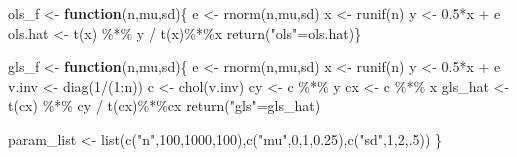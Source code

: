 \documentclass[11pt,a4paper]{article}
\newenvironment{Shaded}{\begin{snugshade}}{\end{snugshade}}
\newcommand{\ControlFlowTok}[1]{\textcolor[rgb]{0.13,0.29,0.53}{\textbf{#1}}}
\newcommand{\DecValTok}[1]{\textcolor[rgb]{0.00,0.00,0.81}{#1}}
\newcommand{\FloatTok}[1]{\textcolor[rgb]{0.00,0.00,0.81}{#1}}
\newcommand{\FunctionTok}[1]{\textcolor[rgb]{0.00,0.00,0.00}{#1}}
\newcommand{\NormalTok}[1]{#1}
\newcommand{\OtherTok}[1]{\textcolor[rgb]{0.56,0.35,0.01}{#1}}
\newcommand{\SpecialCharTok}[1]{\textcolor[rgb]{0.00,0.00,0.00}{#1}}
\newcommand{\StringTok}[1]{\textcolor[rgb]{0.31,0.60,0.02}{#1}}
\begin{document}
\begin{Shaded}
\begin{Highlighting}[]
\NormalTok{ols\_f }\OtherTok{\textless{}{-}} \ControlFlowTok{function}\NormalTok{(n,mu,sd)\{}
\NormalTok{  e }\OtherTok{\textless{}{-}} \FunctionTok{rnorm}\NormalTok{(n,mu,sd)}
\NormalTok{  x }\OtherTok{\textless{}{-}} \FunctionTok{runif}\NormalTok{(n)}
\NormalTok{  y }\OtherTok{\textless{}{-}} \FloatTok{0.5}\SpecialCharTok{*}\NormalTok{x }\SpecialCharTok{+}\NormalTok{ e}
\NormalTok{  ols.hat }\OtherTok{\textless{}{-}} \FunctionTok{t}\NormalTok{(x) }\SpecialCharTok{\%*\%}\NormalTok{ y }\SpecialCharTok{/} \FunctionTok{t}\NormalTok{(x)}\SpecialCharTok{\%*\%}\NormalTok{x}
  \FunctionTok{return}\NormalTok{(}\StringTok{"ols"}\OtherTok{=}\NormalTok{ols.hat)\}}

\NormalTok{gls\_f }\OtherTok{\textless{}{-}} \ControlFlowTok{function}\NormalTok{(n,mu,sd)\{}
\NormalTok{  e }\OtherTok{\textless{}{-}} \FunctionTok{rnorm}\NormalTok{(n,mu,sd)}
\NormalTok{  x }\OtherTok{\textless{}{-}} \FunctionTok{runif}\NormalTok{(n)}
\NormalTok{  y }\OtherTok{\textless{}{-}} \FloatTok{0.5}\SpecialCharTok{*}\NormalTok{x }\SpecialCharTok{+}\NormalTok{ e}
\NormalTok{  v.inv }\OtherTok{\textless{}{-}} \FunctionTok{diag}\NormalTok{(}\DecValTok{1}\SpecialCharTok{/}\NormalTok{(}\DecValTok{1}\SpecialCharTok{:}\NormalTok{n))}
\NormalTok{  c }\OtherTok{\textless{}{-}} \FunctionTok{chol}\NormalTok{(v.inv)}
\NormalTok{  cy }\OtherTok{\textless{}{-}}\NormalTok{ c }\SpecialCharTok{\%*\%}\NormalTok{ y}
\NormalTok{  cx }\OtherTok{\textless{}{-}}\NormalTok{ c }\SpecialCharTok{\%*\%}\NormalTok{ x}
\NormalTok{  gls\_hat }\OtherTok{\textless{}{-}} \FunctionTok{t}\NormalTok{(cx) }\SpecialCharTok{\%*\%}\NormalTok{ cy }\SpecialCharTok{/} \FunctionTok{t}\NormalTok{(cx)}\SpecialCharTok{\%*\%}\NormalTok{cx}
  \FunctionTok{return}\NormalTok{(}\StringTok{"gls"}\OtherTok{=}\NormalTok{gls\_hat)}
  
\NormalTok{  param\_list }\OtherTok{\textless{}{-}} \FunctionTok{list}\NormalTok{(}\FunctionTok{c}\NormalTok{(}\StringTok{"n"}\NormalTok{,}\DecValTok{100}\NormalTok{,}\DecValTok{1000}\NormalTok{,}\DecValTok{100}\NormalTok{),}\FunctionTok{c}\NormalTok{(}\StringTok{"mu"}\NormalTok{,}\DecValTok{0}\NormalTok{,}\DecValTok{1}\NormalTok{,}\FloatTok{0.25}\NormalTok{),}\FunctionTok{c}\NormalTok{(}\StringTok{"sd"}\NormalTok{,}\DecValTok{1}\NormalTok{,}\DecValTok{2}\NormalTok{,.}\DecValTok{5}\NormalTok{))}
\NormalTok{\}}
\end{Highlighting}
\end{Shaded}
\end{document}

